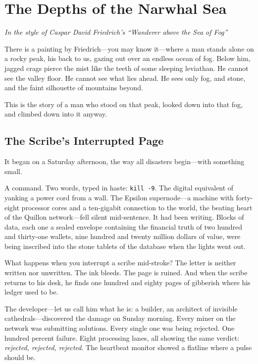 \documentclass[11pt,a4paper]{article}
\begin{document}
\tableofcontents
\newpage

\section{The Depths of the Narwhal Sea}

\begin{storybox}
\textit{In the style of Caspar David Friedrich's ``Wanderer above the Sea of Fog''}
\end{storybox}

\medskip

There is a painting by Friedrich---you may know it---where a man stands alone on a rocky peak, his back to us, gazing out over an endless ocean of fog. Below him, jagged crags pierce the mist like the teeth of some sleeping leviathan. He cannot see the valley floor. He cannot see what lies ahead. He sees only fog, and stone, and the faint silhouette of mountains beyond.

This is the story of a man who stood on that peak, looked down into that fog, and climbed down into it anyway.

\subsection*{The Scribe's Interrupted Page}

It began on a Saturday afternoon, the way all disasters begin---with something small.

A command. Two words, typed in haste: \texttt{kill -9}. The digital equivalent of yanking a power cord from a wall. The Epsilon supernode---a machine with forty-eight processor cores and a ten-gigabit connection to the world, the beating heart of the Quillon network---fell silent mid-sentence. It had been writing. Blocks of data, each one a sealed envelope containing the financial truth of two hundred and thirty-one wallets, nine hundred and twenty million dollars of value, were being inscribed into the stone tablets of the database when the lights went out.

What happens when you interrupt a scribe mid-stroke? The letter is neither written nor unwritten. The ink bleeds. The page is ruined. And when the scribe returns to his desk, he finds one hundred and eighty pages of gibberish where his ledger used to be.

The developer---let us call him what he is: a builder, an architect of invisible cathedrals---discovered the damage on Sunday morning. Every miner on the network was submitting solutions. Every single one was being rejected. One hundred percent failure. Eight processing lanes, all showing the same verdict: \textit{rejected, rejected, rejected}. The heartbeat monitor showed a flatline where a pulse should be.
\end{document}
